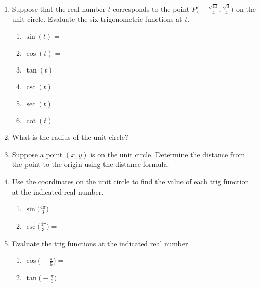 


\begin{enumerate}
\item  Suppose that the real number $t$ corresponds to the point $\displaystyle P\Big(-\frac{\sqrt{13}}{4},\frac{\sqrt{3}}{4}\Big)$ on the unit circle.  Evaluate the six trigonometric functions at $t$.
\begin{enumerate}

\item $\sin(t)=$\vfill
\item $\cos(t)=$\vfill
\item $\tan(t)=$\vfill
\item $\csc(t)=$\vfill
\item $\sec(t)=$\vfill
\item $\cot(t)=$\vfill
\end{enumerate}

\item What is the radius of the unit circle?
  \vfill

\item Suppose a point $(x,y)$ is on the unit circle. Determine the
  distance from the point to the origin using the distance formula.
    \vfill


\clearpage


\item Use the coordinates on the unit circle to find the value of each trig function at the indicated real number.
\begin{enumerate}
\item $\displaystyle \sin\Big(\frac{4\pi}{3}\Big)=$\vfill
\item $\displaystyle \csc\Big(\frac{4\pi}{3}\Big)=$\vfill
\end{enumerate}

\item  Evaluate the trig functions at the indicated real number.
\begin{enumerate}
\item $\displaystyle \cos\Big(-\frac{\pi}{6}\Big)=$\vfill
\item $\displaystyle \tan\Big(-\frac{\pi}{6}\Big)=$\vfill
\end{enumerate}




\end{enumerate}



